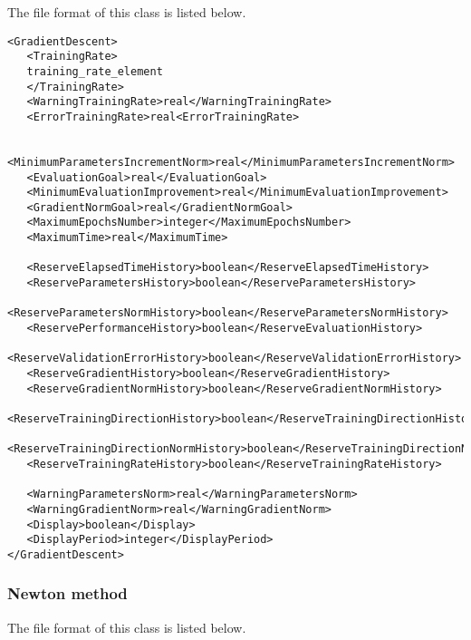 The file format of this class is listed below. 

\begin{lstlisting}
<GradientDescent>
   <TrainingRate>
   training_rate_element
   </TrainingRate>
   <WarningTrainingRate>real</WarningTrainingRate>
   <ErrorTrainingRate>real<ErrorTrainingRate>
   
   <MinimumParametersIncrementNorm>real</MinimumParametersIncrementNorm>
   <EvaluationGoal>real</EvaluationGoal>
   <MinimumEvaluationImprovement>real</MinimumEvaluationImprovement>
   <GradientNormGoal>real</GradientNormGoal>
   <MaximumEpochsNumber>integer</MaximumEpochsNumber>
   <MaximumTime>real</MaximumTime>
   
   <ReserveElapsedTimeHistory>boolean</ReserveElapsedTimeHistory>
   <ReserveParametersHistory>boolean</ReserveParametersHistory>
   <ReserveParametersNormHistory>boolean</ReserveParametersNormHistory>
   <ReservePerformanceHistory>boolean</ReserveEvaluationHistory>
   <ReserveValidationErrorHistory>boolean</ReserveValidationErrorHistory>
   <ReserveGradientHistory>boolean</ReserveGradientHistory>
   <ReserveGradientNormHistory>boolean</ReserveGradientNormHistory>
   <ReserveTrainingDirectionHistory>boolean</ReserveTrainingDirectionHistory>
   <ReserveTrainingDirectionNormHistory>boolean</ReserveTrainingDirectionNormHistory>
   <ReserveTrainingRateHistory>boolean</ReserveTrainingRateHistory>
   
   <WarningParametersNorm>real</WarningParametersNorm>
   <WarningGradientNorm>real</WarningGradientNorm>
   <Display>boolean</Display>
   <DisplayPeriod>integer</DisplayPeriod>
</GradientDescent>   
\end{lstlisting}

\subsubsection*{Newton method}

The file format of this class is listed below. 

